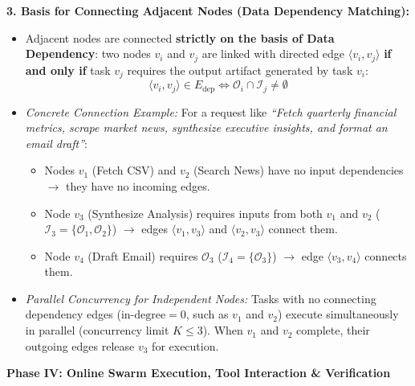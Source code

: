 \documentclass[11pt,a4paper]{article}
\begin{document}
\vspace{0.06em}
\textbf{3. Basis for Connecting Adjacent Nodes (Data Dependency Matching):}
\begin{itemize}[leftmargin=1.5em, itemsep=0.06em, topsep=0.02em]
    \item Adjacent nodes are connected \textbf{strictly on the basis of Data Dependency}: two nodes $v_i$ and $v_j$ are linked with directed edge $\langle v_i, v_j \rangle$ \textbf{if and only if} task $v_j$ requires the output artifact generated by task $v_i$:
    \begin{equation*}
    \langle v_i, v_j \rangle \in E_{\text{dep}} \iff \mathcal{O}_i \cap \mathcal{I}_j \neq \emptyset
    \end{equation*}
    \item \textit{Concrete Connection Example:} For a request like \textit{``Fetch quarterly financial metrics, scrape market news, synthesize executive insights, and format an email draft''}:
    \begin{itemize}[leftmargin=1.4em, itemsep=0.02em, topsep=0.01em]
        \item Nodes $v_1$ (Fetch CSV) and $v_2$ (Search News) have no input dependencies $\to$ they have no incoming edges.
        \item Node $v_3$ (Synthesize Analysis) requires inputs from both $v_1$ and $v_2$ ($\mathcal{I}_3 = \{\mathcal{O}_1, \mathcal{O}_2\}$) $\to$ edges $\langle v_1, v_3 \rangle$ and $\langle v_2, v_3 \rangle$ connect them.
        \item Node $v_4$ (Draft Email) requires $\mathcal{O}_3$ ($\mathcal{I}_4 = \{\mathcal{O}_3\}$) $\to$ edge $\langle v_3, v_4 \rangle$ connects them.
    \end{itemize}
    \item \textit{Parallel Concurrency for Independent Nodes:} Tasks with no connecting dependency edges ($\text{in-degree} = 0$, such as $v_1$ and $v_2$) execute simultaneously in parallel (concurrency limit $K \le 3$). When $v_1$ and $v_2$ complete, their outgoing edges release $v_3$ for execution.
\end{itemize}

\clearpage


\textbf{Phase IV: Online Swarm Execution, Tool Interaction \& Verification}
\end{document}
